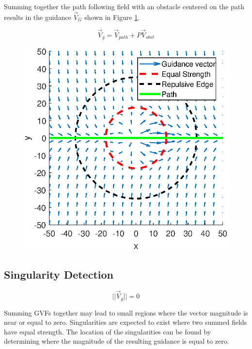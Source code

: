 \documentclass[conf]{new-aiaa}
\begin{document}

Summing together the path following field with an obstacle centered on the path results in the guidance $\overrightarrow{V}_G$ shown in Figure \ref{fig:summedquiver}.

\begin{equation}
\label{eq:singularityCondition}
\overrightarrow{V}_g = \overrightarrow{V}_{path} + P\overrightarrow{V}_{obst}
\end{equation}




\begin{figure}[H]
	\centering
	\includegraphics[width=0.7\linewidth]{Figures/methods/summedQuiver}
	\caption{}
	\label{fig:summedquiver}
\end{figure}










\subsection{Singularity Detection}
\begin{equation}
\label{eq:singularityCondition}
||\overrightarrow{V}_g || = 0
\end{equation}

Summing GVFs together may lead to small regions where the vector magnitude is near or equal to zero. Singularities are expected to exist where two summed fields have equal strength. The location of the singularities can be found by determining where the magnitude of the resulting guidance is equal to zero.
\end{document}
